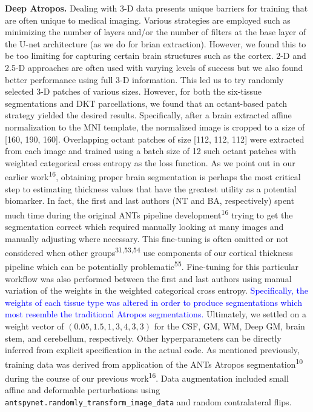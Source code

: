 \documentclass[12pt,]{article}
\begin{document}
\textbf{Deep Atropos.} Dealing with 3-D data presents unique barriers
for training that are often unique to medical imaging. Various
strategies are employed such as minimizing the number of layers and/or
the number of filters at the base layer of the U-net architecture (as we
do for brian extraction). However, we found this to be too limiting for
capturing certain brain structures such as the cortex. 2-D and 2.5-D
approaches are often used with varying levels of success but we also
found better performance using full 3-D information. This led us to try
randomly selected 3-D patches of various sizes. However, for both the
six-tissue segmentations and DKT parcellations, we found that an
octant-based patch strategy yielded the desired results. Specifically,
after a brain extracted affine normalization to the MNI template, the
normalized image is cropped to a size of {[}160, 190, 160{]}.
Overlapping octant patches of size {[}112, 112, 112{]} were extracted
from each image and trained using a batch size of 12 such octant patches
with weighted categorical cross entropy as the loss function. As we
point out in our earlier work\textsuperscript{16}, obtaining proper
brain segmentation is perhaps the most critical step to estimating
thickness values that have the greatest utility as a potential
biomarker. In fact, the first and last authors (NT and BA, respectively)
spent much time during the original ANTs pipeline
development\textsuperscript{16} trying to get the segmentation correct
which required manually looking at many images and manually adjusting
where necessary. This fine-tuning is often omitted or not considered
when other groups\textsuperscript{31,53,54} use components of our
cortical thickness pipeline which can be potentially
problematic\textsuperscript{55}. Fine-tuning for this particular
workflow was also performed between the first and last authors using
manual variation of the weights in the weighted categorical cross
entropy.
\textcolor{blue}{Specifically, the weights of each tissue type was altered in
order to produce segmentations which most resemble the traditional Atropos segmentations.}
Ultimately, we settled on a weight vector of
\((0.05, 1.5, 1, 3, 4, 3, 3)\) for the CSF, GM, WM, Deep GM, brain stem,
and cerebellum, respectively. Other hyperparameters can be directly
inferred from explicit specification in the actual code. As mentioned
previously, training data was derived from application of the ANTs
Atropos segmentation\textsuperscript{10} during the course of our
previous work\textsuperscript{16}. Data augmentation included small
affine and deformable perturbations using
\texttt{antspynet.randomly\_transform\_image\_data} and random
contralateral flips.
\end{document}
